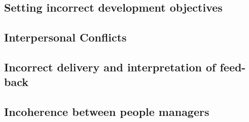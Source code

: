 \subsection{Setting incorrect development objectives}
\label{subsec:devobjectives}
\newline

\subsection{Interpersonal Conflicts}
\label{subsec:conflicts}
\newline

\subsection{Incorrect delivery and interpretation of feed-back}
\label{subsec:incorrectfeedback}
\newline

\subsection{Incoherence between people managers}
\label{subsec:incoherence}
\newline

